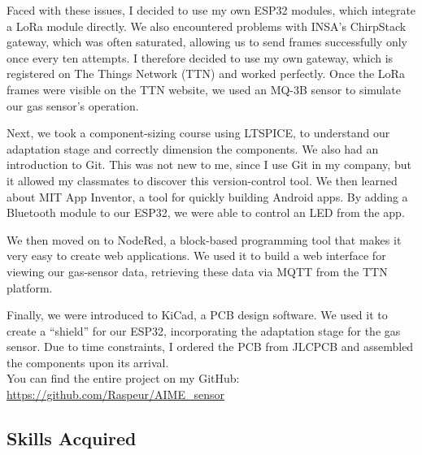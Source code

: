 \noindent Faced with these issues, I decided to use my own ESP32 modules, which integrate a LoRa module directly. We also encountered problems with INSA's ChirpStack gateway, which was often saturated, allowing us to send frames successfully only once every ten attempts. I therefore decided to use my own gateway, which is registered on The Things Network (TTN) and worked perfectly. Once the LoRa frames were visible on the TTN website, we used an MQ-3B sensor to simulate our gas sensor's operation.
\vspace{0.25cm}

\noindent Next, we took a component-sizing course using LTSPICE, to understand our adaptation stage and correctly dimension the components.
We also had an introduction to Git. This was not new to me, since I use Git in my company, but it allowed my classmates to discover this version-control tool.
We then learned about MIT App Inventor, a tool for quickly building Android apps. By adding a Bluetooth module to our ESP32, we were able to control an LED from the app.
\vspace{0.25cm}

\noindent We then moved on to NodeRed, a block-based programming tool that makes it very easy to create web applications. We used it to build a web interface for viewing our gas-sensor data, retrieving these data via MQTT from the TTN platform.
\vspace{0.25cm}

\noindent Finally, we were introduced to KiCad, a PCB design software. We used it to create a “shield” for our ESP32, incorporating the adaptation stage for the gas sensor. Due to time constraints, I ordered the PCB from JLCPCB and assembled the components upon its arrival. \\
You can find the entire project on my GitHub: \url{https://github.com/Raspeur/AIME_sensor}

\subsection{Skills Acquired}


